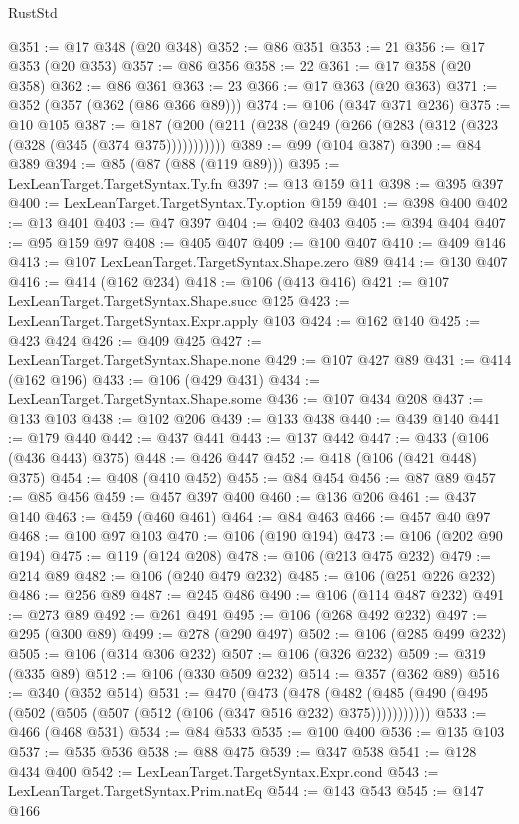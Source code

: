 \begin{lexlean}{RustStd}
\begin{coremodule}
@351 := @17 @348 (@20 @348)
@352 := @86 @351
@353 := 21
@356 := @17 @353 (@20 @353)
@357 := @86 @356
@358 := 22
@361 := @17 @358 (@20 @358)
@362 := @86 @361
@363 := 23
@366 := @17 @363 (@20 @363)
@371 := @352 (@357 (@362 (@86 @366 @89)))
@374 := @106 (@347 @371 @236)
@375 := @10 @105
@387 := @187 (@200 (@211 (@238 (@249 (@266 (@283 (@312 (@323 (@328 (@345 (@374 @375)))))))))))
@389 := @99 (@104 @387)
@390 := @84 @389
@394 := @85 (@87 (@88 (@119 @89)))
@395 := LexLeanTarget.TargetSyntax.Ty.fn
@397 := @13 @159 @11
@398 := @395 @397
@400 := LexLeanTarget.TargetSyntax.Ty.option @159
@401 := @398 @400
@402 := @13 @401
@403 := @47 @397
@404 := @402 @403
@405 := @394 @404
@407 := @95 @159 @97
@408 := @405 @407
@409 := @100 @407
@410 := @409 @146
@413 := @107 LexLeanTarget.TargetSyntax.Shape.zero @89
@414 := @130 @407
@416 := @414 (@162 @234)
@418 := @106 (@413 @416)
@421 := @107 LexLeanTarget.TargetSyntax.Shape.succ @125
@423 := LexLeanTarget.TargetSyntax.Expr.apply @103
@424 := @162 @140
@425 := @423 @424
@426 := @409 @425
@427 := LexLeanTarget.TargetSyntax.Shape.none
@429 := @107 @427 @89
@431 := @414 (@162 @196)
@433 := @106 (@429 @431)
@434 := LexLeanTarget.TargetSyntax.Shape.some
@436 := @107 @434 @208
@437 := @133 @103
@438 := @102 @206
@439 := @133 @438
@440 := @439 @140
@441 := @179 @440
@442 := @437 @441
@443 := @137 @442
@447 := @433 (@106 (@436 @443) @375)
@448 := @426 @447
@452 := @418 (@106 (@421 @448) @375)
@454 := @408 (@410 @452)
@455 := @84 @454
@456 := @87 @89
@457 := @85 @456
@459 := @457 @397 @400
@460 := @136 @206
@461 := @437 @140
@463 := @459 (@460 @461)
@464 := @84 @463
@466 := @457 @40 @97
@468 := @100 @97 @103
@470 := @106 (@190 @194)
@473 := @106 (@202 @90 @194)
@475 := @119 (@124 @208)
@478 := @106 (@213 @475 @232)
@479 := @214 @89
@482 := @106 (@240 @479 @232)
@485 := @106 (@251 @226 @232)
@486 := @256 @89
@487 := @245 @486
@490 := @106 (@114 @487 @232)
@491 := @273 @89
@492 := @261 @491
@495 := @106 (@268 @492 @232)
@497 := @295 (@300 @89)
@499 := @278 (@290 @497)
@502 := @106 (@285 @499 @232)
@505 := @106 (@314 @306 @232)
@507 := @106 (@326 @232)
@509 := @319 (@335 @89)
@512 := @106 (@330 @509 @232)
@514 := @357 (@362 @89)
@516 := @340 (@352 @514)
@531 := @470
    (@473
      (@478 (@482 (@485 (@490 (@495 (@502 (@505 (@507 (@512 (@106 (@347 @516 @232) @375)))))))))))
@533 := @466 (@468 @531)
@534 := @84 @533
@535 := @100 @400
@536 := @135 @103
@537 := @535 @536
@538 := @88 @475
@539 := @347 @538
@541 := @128 @434 @400
@542 := LexLeanTarget.TargetSyntax.Expr.cond
@543 := LexLeanTarget.TargetSyntax.Prim.natEq
@544 := @143 @543
@545 := @147 @166

\end{coremodule}
\end{lexlean}
